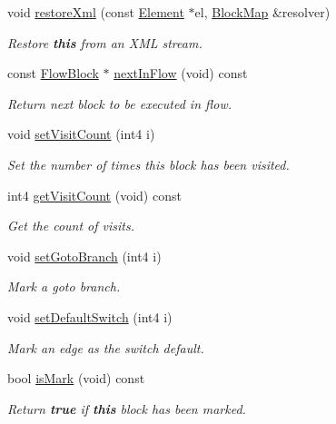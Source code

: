 \begin{DoxyCompactItemize}
void \mbox{\hyperlink{class_flow_block_a002ddc14dc84098dcb14b513f8b973c1}{restore\+Xml}} (const \mbox{\hyperlink{class_element}{Element}} $\ast$el, \mbox{\hyperlink{class_block_map}{Block\+Map}} \&resolver)
\begin{DoxyCompactList}\small\item\em Restore {\bfseries{this}} from an X\+ML stream. \end{DoxyCompactList}\item 
const \mbox{\hyperlink{class_flow_block}{Flow\+Block}} $\ast$ \mbox{\hyperlink{class_flow_block_adb062ea29f2d073206adf61c317e97c7}{next\+In\+Flow}} (void) const
\begin{DoxyCompactList}\small\item\em Return next block to be executed in flow. \end{DoxyCompactList}\item 
void \mbox{\hyperlink{class_flow_block_a55c52137e9aff59348f026f17d9801f0}{set\+Visit\+Count}} (int4 i)
\begin{DoxyCompactList}\small\item\em Set the number of times this block has been visited. \end{DoxyCompactList}\item 
int4 \mbox{\hyperlink{class_flow_block_a428b120c7f39be662e4b82ffb62f98bb}{get\+Visit\+Count}} (void) const
\begin{DoxyCompactList}\small\item\em Get the count of visits. \end{DoxyCompactList}\item 
void \mbox{\hyperlink{class_flow_block_a50ac469ba63c50f574bf05f18a307f8c}{set\+Goto\+Branch}} (int4 i)
\begin{DoxyCompactList}\small\item\em Mark a {\itshape goto} branch. \end{DoxyCompactList}\item 
void \mbox{\hyperlink{class_flow_block_a0056fb3c60ff3449a313171dee202c76}{set\+Default\+Switch}} (int4 i)
\begin{DoxyCompactList}\small\item\em Mark an edge as the switch default. \end{DoxyCompactList}\item 
bool \mbox{\hyperlink{class_flow_block_a1b2d32b7b1d9850f7244f8c8b3ce4d37}{is\+Mark}} (void) const
\begin{DoxyCompactList}\small\item\em Return {\bfseries{true}} if {\bfseries{this}} block has been marked. \end{DoxyCompactList}\item 

\end{DoxyCompactItemize}
